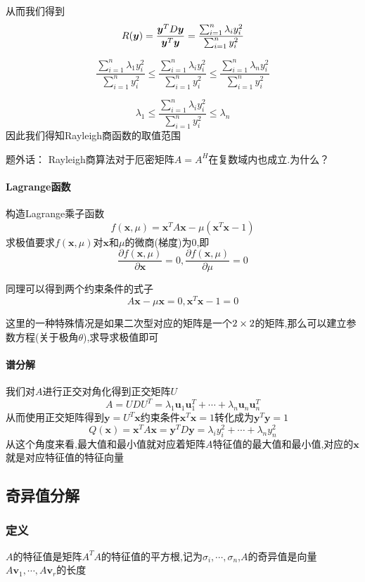 \documentclass{article}
\newcommand{\ve}{\boldsymbol}
\begin{document}
\begin{CJK}{UTF8}{gkai}
从而我们得到
\[
    R(\ve{y}) = \dfrac{\ve{y}^T D \ve{y}}{\ve{y}^T \ve{y}} = \dfrac{\sum_{i = 1}^{n} \lambda_i y_i^2}{\sum_{i = 1}^{n}  y_i^2}\\  
\]

\[\dfrac{\sum_{i = 1}^{n} \lambda_1 y_i^2}{\sum_{i = 1}^{n}  y_i^2}\leq \dfrac{\sum_{i = 1}^{n} \lambda_i y_i^2}{\sum_{i = 1}^{n}  y_i^2}\leq \dfrac{\sum_{i = 1}^{n} \lambda_n y_i^2}{\sum_{i = 1}^{n}  y_i^2}\]

\[\lambda_1\leq \dfrac{\sum_{i = 1}^{n} \lambda_i y_i^2}{\sum_{i = 1}^{n}  y_i^2}\leq \lambda_n\]
因此我们得知Rayleigh商函数的取值范围

题外话： Rayleigh商算法对于厄密矩阵$A = A^H$在复数域内也成立.为什么？

\paragraph{Lagrange函数}
构造Lagrange乘子函数
\[f(\ve{x},\mu) = \ve{x}^T A \ve{x} - \mu(\ve{x}^T \ve{x} - 1)\]
求极值要求$f(\ve{x},\mu)$对$\ve{x}$和$\mu$的微商(梯度)为$0$,即
\[\dfrac{\partial f(\ve{x},\mu)}{\partial \ve{x}} = 0,\dfrac{\partial f(\ve{x},\mu)}{\partial \mu} = 0\]

同理可以得到两个约束条件的式子
\[A\ve{x} - \mu \ve{x} = 0, \ve{x}^T \ve{x}  -  1 = 0\]

这里的一种特殊情况是如果二次型对应的矩阵是一个$2\times 2$的矩阵,那么可以建立参数方程(关于极角$\theta$),求导求极值即可
\paragraph{谱分解}
我们对$A$进行正交对角化得到正交矩阵$U$
\[A=U D U^T = \lambda_1\ve{u}_1 \ve{u}_1^T + \cdots + \lambda_n\ve{u}_n \ve{u}_n^T\]
从而使用正交矩阵得到$\ve{y} = U^T \ve{x}$约束条件$\ve{x}^T \ve{x} = 1$转化成为$\ve{y}^T \ve{y} = 1$\\

\[Q(\ve{x}) = \ve{x}^T A \ve{x} = \ve{y}^T D \ve{y} = \lambda_i y_i^2 + \cdots + \lambda_n y_n^2\]
从这个角度来看,最大值和最小值就对应着矩阵$A$特征值的最大值和最小值,对应的$\ve{x}$就是对应特征值的特征向量
\subsection{奇异值分解}
\subsubsection{定义}
$A$的特征值是矩阵$A^T A$的特征值的平方根,记为$\sigma_i,\cdots,\sigma_n$,$A$的奇异值是向量$A\ve{v}_1,\cdots , A\ve{v}_r$的长度


\end{CJK}
\end{document}
